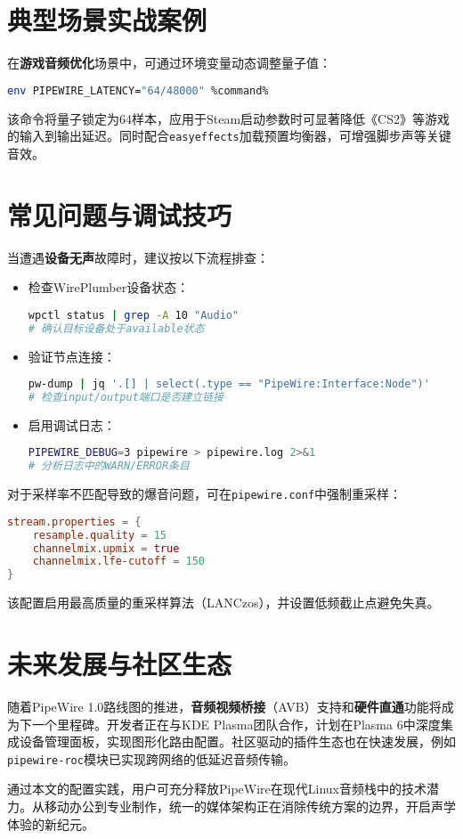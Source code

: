 \chapter{典型场景实战案例}
在\textbf{游戏音频优化}场景中，可通过环境变量动态调整量子值：\par
\begin{lstlisting}[language=bash]
env PIPEWIRE_LATENCY="64/48000" %command%
\end{lstlisting}
该命令将量子锁定为64样本，应用于Steam启动参数时可显著降低《CS2》等游戏的输入到输出延迟。同时配合\verb!easyeffects!加载预置均衡器，可增强脚步声等关键音效。\par
\chapter{常见问题与调试技巧}
当遭遇\textbf{设备无声}故障时，建议按以下流程排查：\par
\begin{itemize}
\item 检查WirePlumber设备状态：\begin{lstlisting}[language=bash]
wpctl status | grep -A 10 "Audio"
# 确认目标设备处于available状态
\end{lstlisting}

\item 验证节点连接：\begin{lstlisting}[language=bash]
pw-dump | jq '.[] | select(.type == "PipeWire:Interface:Node")'
# 检查input/output端口是否建立链接
\end{lstlisting}

\item 启用调试日志：\begin{lstlisting}[language=bash]
PIPEWIRE_DEBUG=3 pipewire > pipewire.log 2>&1
# 分析日志中的WARN/ERROR条目
\end{lstlisting}

\end{itemize}
对于采样率不匹配导致的爆音问题，可在\verb!pipewire.conf!中强制重采样：\par
\begin{lstlisting}[language=conf]
stream.properties = {
    resample.quality = 15
    channelmix.upmix = true
    channelmix.lfe-cutoff = 150
}
\end{lstlisting}
该配置启用最高质量的重采样算法（LANCzos），并设置低频截止点避免失真。\par
\chapter{未来发展与社区生态}
随着PipeWire 1.0路线图的推进，\textbf{音频视频桥接}（AVB）支持和\textbf{硬件直通}功能将成为下一个里程碑。开发者正在与KDE Plasma团队合作，计划在Plasma 6中深度集成设备管理面板，实现图形化路由配置。社区驱动的插件生态也在快速发展，例如\verb!pipewire-roc!模块已实现跨网络的低延迟音频传输。\par
通过本文的配置实践，用户可充分释放PipeWire在现代Linux音频栈中的技术潜力。从移动办公到专业制作，统一的媒体架构正在消除传统方案的边界，开启声学体验的新纪元。\par
